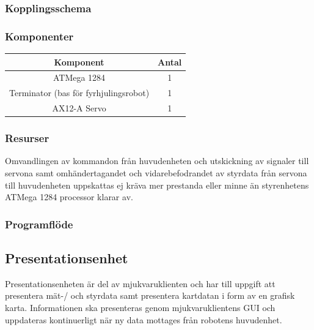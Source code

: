 \documentclass{article}
\begin{document}
\subsubsection{Kopplingsschema}

\subsubsection{Komponenter}

\begin{table}[H]
  \centering
  \begin{tabular}{ | c | c |}
    \hline
    \textbf{Komponent} & \textbf{Antal} \\
    \hline
    ATMega 1284 & 1 \\
    \hline
    Terminator (bas för fyrhjulingsrobot) & 1 \\
    \hline
    AX12-A Servo & 1 \\
    \hline

  \end{tabular}
\end{table}

\subsubsection{Resurser}

Omvandlingen av kommandon från huvudenheten och utskickning av signaler till servona samt omhändertagandet och vidarebefodrandet av styrdata från servona till huvudenheten uppskattas ej kräva mer prestanda eller minne än styrenhetens ATMega 1284 processor klarar av. 

\subsubsection{Programflöde}

\clearpage

\subsection{Presentationsenhet}
Presentationsenheten är del av mjukvaruklienten och har till uppgift att presentera mät-/ och styrdata samt presentera kartdatan i form av en grafisk karta. Informationen ska presenteras genom mjukvaruklientens GUI och uppdateras kontinuerligt när ny data mottages från robotens huvudenhet. 
\end{document}
